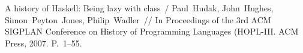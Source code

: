 \begin{thebibliography}{10}
  A history of Haskell: Being lazy with class~/ Paul~Hudak, John~Hughes,
    Simon~Peyton~Jones, Philip~Wadler~// In Proceedings of the 3rd ACM SIGPLAN
    Conference on History of Programming Languages (HOPL-III. \BibDash
  \newblock ACM Press, 2007. \BibDash
  \newblock P.~1--55.

  \end{thebibliography}


% 
% 

